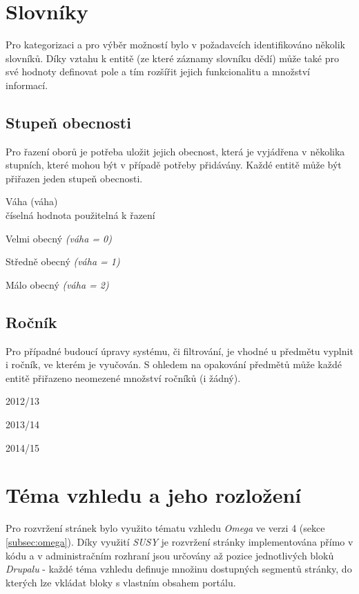 \section{Slovníky}
\label{sec:slovniky}

Pro kategorizaci a pro výběr možností bylo v požadavcích identifikováno několik slovníků. Díky vztahu k entitě (ze které záznamy slovníku dědí) může také pro své hodnoty definovat pole a tím rozšířit jejich funkcionalitu a množství informací.

\subsection*{Stupeň obecnosti}
Pro řazení oborů je potřeba uložit jejich obecnost, která je vyjádřena v několika stupních, které mohou být v případě potřeby přidávány. Každé entitě může být přiřazen jeden stupeň obecnosti.

\begin{list}{-}{Pole}
  \item Váha (váha) \hfill \\
    číselná hodnota použitelná k řazení
\end{list}

\begin{list}{-}{Hodnoty}
  \item Velmi obecný \emph{(váha = 0)} 
  \item Středně obecný \emph{(váha = 1)}
  \item Málo obecný \emph{(váha = 2)}
\end{list}

\subsection*{Ročník}
Pro případné budoucí úpravy systému, či filtrování, je vhodné u předmětu vyplnit i ročník, ve kterém je vyučován. S ohledem na opakování předmětů může každé entitě přiřazeno neomezené množství ročníků (i žádný). 

\begin{list}{-}{Hodnoty}
  \item 2012/13
  \item 2013/14
  \item 2014/15
\end{list}

\section{Téma vzhledu a jeho rozložení}
\label{sec:tema-vzhledu}
Pro rozvržení stránek bylo využito tématu vzhledu \emph{Omega} ve verzi 4 (sekce \ref{subsec:omega}). Díky využití \emph{SUSY} je rozvržení stránky implementována přímo v kódu a v administračním rozhraní jsou určovány až pozice jednotlivých bloků \emph{Drupalu} - každé téma vzhledu definuje množinu dostupných segmentů stránky, do kterých lze vkládat bloky s vlastním obsahem portálu. 


